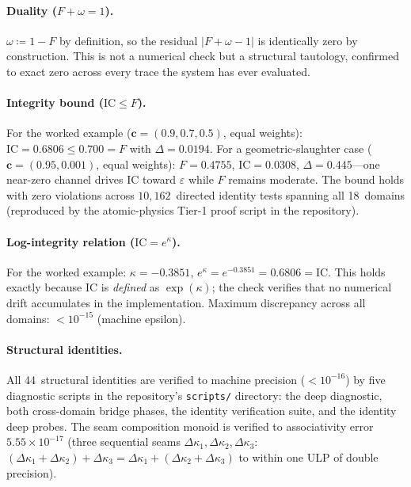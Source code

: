 \documentclass[
  aps,
  prd,
  twocolumn,
  superscriptaddress,
  nofootinbib,
  floatfix
]{revtex4-2}
\newcommand{\eps}{\varepsilon}
\newcommand{\tvec}{\mathbf{c}}
\newcommand{\IC}{\mathrm{IC}}
\begin{document}
\paragraph{Duality ($F + \omega = 1$).}
$\omega \coloneqq 1 - F$ by definition, so the residual
$|F + \omega - 1|$ is identically zero by construction.
This is not a numerical check but a structural tautology,
confirmed to exact zero across every trace the system has
ever evaluated.

\paragraph{Integrity bound ($\IC \leq F$).}
For the worked example ($\tvec = (0.9, 0.7, 0.5)$,
equal weights): $\IC = 0.6806 \leq 0.700 = F$ with
$\Delta = 0.0194$.  For a geometric-slaughter case
($\tvec = (0.95, 0.001)$, equal weights): $F = 0.4755$,
$\IC = 0.0308$, $\Delta = 0.445$---one near-zero channel
drives $\IC$ toward $\eps$ while $F$ remains moderate.
The bound holds with zero violations across $10{,}162$~directed
identity tests spanning all 18~domains (reproduced by the
atomic-physics Tier-1 proof script in the repository).

\paragraph{Log-integrity relation ($\IC = e^\kappa$).}
For the worked example: $\kappa = -0.3851$,
$e^\kappa = e^{-0.3851} = 0.6806 = \IC$.  This holds exactly
because $\IC$ is \emph{defined} as $\exp(\kappa)$; the check
verifies that no numerical drift accumulates in the
implementation.  Maximum discrepancy across all domains:
$< 10^{-15}$ (machine epsilon).

\paragraph{Structural identities.}
All 44~structural identities are verified to machine precision
($< 10^{-16}$) by five diagnostic scripts in the repository's
\texttt{scripts/} directory: the deep diagnostic, both
cross-domain bridge phases, the identity verification suite,
and the identity deep probes.  The seam composition monoid
is verified to associativity error $5.55 \times 10^{-17}$
(three sequential seams
$\Delta\kappa_1, \Delta\kappa_2, \Delta\kappa_3$:
$(\Delta\kappa_1 {+} \Delta\kappa_2) + \Delta\kappa_3 =
\Delta\kappa_1 + (\Delta\kappa_2 {+} \Delta\kappa_3)$
to within one ULP of double precision).
\end{document}
